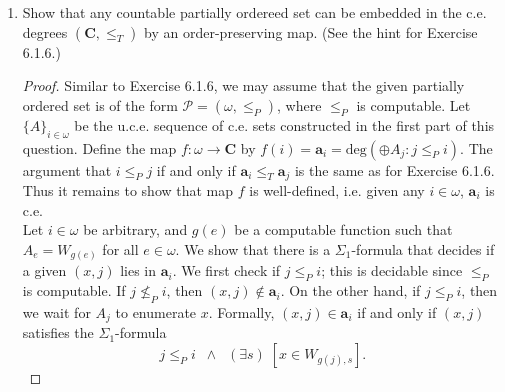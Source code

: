 \documentclass{article}
\begin{document}
\begin{enumerate}[label={(\roman*)}]
\begin{proof}
        Consider the potential witness that for
        $R_{\langle e,i\rangle}$ at stages greater than $s'$. Note that we
        will always consider acting $R_{\langle
        e,i\rangle}$ because the higher prioity requirements that are not
        acted at stage $s'$ never act after stage $s'$.
        Observe that since the restraints imposed by the higher priority
        requirements never change after stage $s'$, the potential witness
        $x\in w_{e,i}-A_i^{s'}$ that we consider will always be the same
        one. Our argument from here will then be similar to the argument
        for the base case - since $\Phi_e^{\oplus_{j\neq i} A_j}(x)$
        converges by assumption, we wait for the first stage $s\geq s'$
        where the sequences involved in the computation stabilizes. Now
        $x\not\in A_i^{s'}$ and $x$ is never enumerated into $A_i$
        because $R_{\langle e,i\rangle}$ never acts after stage
        $s'$, so we must have $\Phi_e^{\oplus_{j\neq i} A_j}(x)=A_i(x)=0$,
        and $R_{\langle e,i\rangle}$ must have been selected to be acted,
        then $x$ will be enumerated into $A_i$ at stage $s$, a
        contradiction.
      \end{proof}

    \item Show that any countable partially ordereed set can be embedded in
      the c.e. degrees $(\bm{C},\leq_T)$ by an order-preserving map.
      (See the hint for Exercise 6.1.6.)

      \begin{proof}
        Similar to Exercise 6.1.6, we may assume that the given partially
        ordered set is of the form $\mathcal{P}=(\omega,\leq_P)$, where
        $\leq_P$ is computable. Let $\{A\}_{i\in\omega}$ be the u.c.e.
        sequence of c.e. sets constructed in the first part of this
        question. Define the map $f:\omega\rightarrow \bm{C}$ by
        $f(i)=\bm{a}_i=\text{deg}(\oplus A_j:j\leq_P i)$. The argument that
        $i\leq_P j$ if and only if $\bm{a}_i\leq_T\bm{a}_j$ is the same as
        for Exercise 6.1.6. Thus it remains to show that map $f$ is
        well-defined, i.e. given any $i\in\omega$, $\bm{a}_i$ is c.e. \\

        Let $i\in\omega$ be arbitrary, and $g(e)$ be a computable function
        such that $A_e=W_{g(e)}$ for all $e\in\omega$. We show that there
        is a $\Sigma_1$-formula that decides if a given $(x,j)$ lies in
        $\bm{a}_i$. We first check if $j\leq_P i$; this is decidable since
        $\leq_P$ is computable. If $j\not\leq_P i$, then
        $(x,j)\not\in\bm{a}_i$. On the other hand, if $j\leq_P i$, then we
        wait for $A_j$ to enumerate $x$. Formally, $(x,j)\in\bm{a}_i$ if
        and only if $(x,j)$ satisfies the $\Sigma_1$-formula
        \[j\leq_Pi\;\; \wedge\;\; (\exists s)\; [x\in W_{g(j),s}].\]
      \end{proof}
  \end{enumerate}
\end{document}
